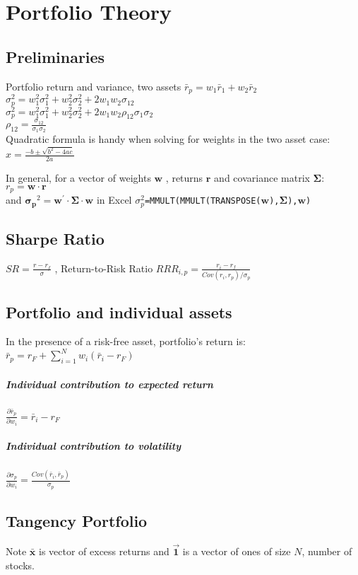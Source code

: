 \section{Portfolio Theory}

\subsection*{Preliminaries}

Portfolio return and variance, two assets
$ \bar{r}_p = w_1 \bar{r}_1 +  w_2 \bar{r}_2 $ \\
$ \sigma_p^2 = w_1^2 \sigma_1^2 + w_2^2 \sigma_2^2 + 2 w_1 w_2 \sigma_{12}  $ \\
$ \sigma_p^2 = w_1^2 \sigma_1^2 + w_2^2 \sigma_2^2 + 2 w_1 w_2 \rho_{12} \sigma_1 \sigma_2  $ \\		
$  \rho_{12} = \frac{\sigma_{12}}{\sigma_1 \sigma_2}$ \\

Quadratic formula is handy when solving for weights in the two asset case:
$x=\frac{-b\pm\sqrt{b^2-4ac}}{2a}$

In general, for a vector of weights $\bm{w}$ , returns $\bm{r}$ and covariance matrix $\bm{\Sigma}$:
$ r_p = \bm{w} \cdotp \bm{r} $ \\ 	and $\bm{ \sigma_p}^2 = \bm{w}^\prime \cdot \bm{\Sigma} \cdot \bm{w} $
in Excel  \texttt{$\sigma_p^2$=MMULT(MMULT(TRANSPOSE($\bm{w}$),$\bm{\Sigma}$),$\bm{w}$)  }


\subsection*{Sharpe Ratio}
$SR = \frac{r-r_f}{\sigma}$ , 
Return-to-Risk Ratio $RRR_{i,p} = \frac{r_i-r_f}{Cov(r_i,r_p)/\sigma_p}$

\subsection*{Portfolio and individual assets}
In the presence of a risk-free asset, portfolio’s return is: $\bar{r}_p =r_F + \sum_{i=1}^{N} w_i (\bar{r}_i -r_F)$

\subparagraph*{Individual contribution to expected return}
$ \frac{\partial \bar{r}_p}{\partial w_i}  = \bar{r}_i - r_F$

\subparagraph*{Individual contribution to volatility}
$ \frac{\partial \sigma_p}{\partial w_i}  = \frac{Cov(\bar{r}_i,\bar{r}_p )}{\sigma_p}$

\subsection*{Tangency Portfolio}
Note $\bm{\bar{x}}$ is vector of excess returns and $\bm{\vec{1}}$ is a vector of ones of size $N$, number of stocks.

